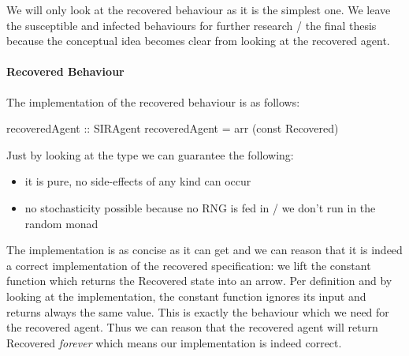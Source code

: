 We will only look at the recovered behaviour as it is the simplest one. We leave the susceptible and infected behaviours for further research / the final thesis because the conceptual idea becomes clear from looking at the recovered agent.

\paragraph{Recovered Behaviour}
The implementation of the recovered behaviour is as follows:

\begin{HaskellCode}
recoveredAgent :: SIRAgent
recoveredAgent = arr (const Recovered)
\end{HaskellCode}

Just by looking at the type we can guarantee the following:
\begin{itemize}
	\item it is pure, no side-effects of any kind can occur
	\item no stochasticity possible because no RNG is fed in / we don't run in the random monad
\end{itemize}

The implementation is as concise as it can get and we can reason that it is indeed a correct implementation of the recovered specification: we lift the constant function which returns the Recovered state into an arrow. Per definition and by looking at the implementation, the constant function ignores its input and returns always the same value. This is exactly the behaviour which we need for the recovered agent. Thus we can reason that the recovered agent will return Recovered \textit{forever} which means our implementation is indeed correct.